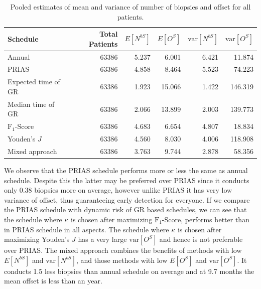 \begin{table}[!htb]
\centering
\captionsetup{justification=centering}
\caption{Pooled estimates of mean and variance of number of biopsies and offset for all patients.}
\label{table : sim_study_pooled_estimates}
\begin{tabular}{@{}lrrrrr@{}}
\toprule
Schedule           & Total Patients & $E[N^{bS}]$ & $E[O^{S}]$ & $\mbox{var}[N^{bS}]$ & $\mbox{var}[O^S]$ \\ \midrule
Annual              & 63386                  & 5.237           & 6.001               & 6.421          & 11.874             \\
PRIAS              & 63386                  & 4.858           & 8.464               & 5.523          & 74.223             \\
Expected time of GR & 63386                  & 1.923           & 15.066              & 1.422          & 146.319            \\
Median time of GR  & 63386                  & 2.066           & 13.899              & 2.003          & 139.773            \\
$\text{F}_1$-Score           & 63386                  & 4.683           & 6.654               & 4.807          & 18.834             \\
Youden's $J$             & 63386                  & 4.560            & 8.030                & 4.006          & 118.908            \\
Mixed approach     & 63386                  & 3.763           & 9.744               & 2.878          & 58.356             \\ \bottomrule
\end{tabular}
\end{table}

We observe that the PRIAS schedule performs more or less the same as annual schedule. Despite this the latter may be preferred over PRIAS since it conducts only 0.38 biopsies more on average, however unlike PRIAS it has very low variance of offset, thus guaranteeing early detection for everyone. If we compare the PRIAS schedule with dynamic risk of GR based schedules, we can see that the schedule where $\kappa$ is chosen after maximizing $\text{F}_1$-Score, performs better than in PRIAS schedule in all aspects. The schedule where $\kappa$ is chosen after maximizing Youden's $J$ has a very large $\mbox{var}[O^S]$ and hence is not preferable over PRIAS. The mixed approach combines the benefits of methods with low $E[N^{bS}]$ and $\mbox{var}[N^{bS}]$, and those methods with low $E[O^{S}]$ and $\mbox{var}[O^S]$. It conducts 1.5 less biopsies than annual schedule on average and at 9.7 months the mean offset is less than an year.\\

